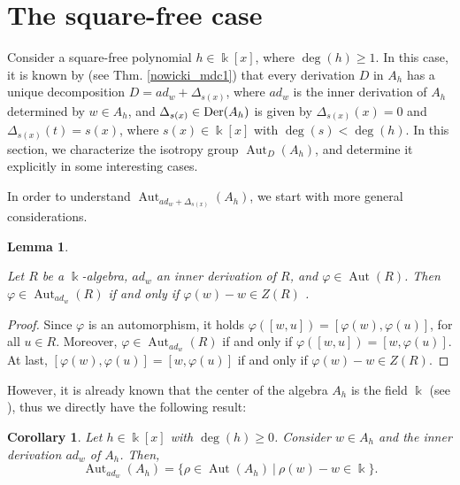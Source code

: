 \documentclass{article}
\numberwithin{equation}{section}\theoremstyle{plain}
\newtheorem{corollary}[theorem]{Corollary}
\newtheorem{lemma}[theorem]{Lemma}
\newcommand{\der}{{\rm Der}}
\DeclareMathOperator{\Aut}{Aut}
\begin{document}
\section{The square-free case}\label{section4}

Consider a  square-free polynomial $h\in \Bbbk[x]$, where $\deg(h)\geq 1$.
In this case, it is known by \cite{Nowicki} (see Thm. \ref{nowicki_mdc1}) that every derivation $D$ in $A_h$ has a unique decomposition $D=ad_w + \Delta_{s(x)}$, where $ad_w$ is the inner derivation of $A_h$ determined by $w \in A_h$, and $\Delta_{s(x)} \in \der(A_h)$ is given by  $\Delta_{s(x)} (x)=0$ and $\Delta_{s(x)} (t)=s(x)$, where $s(x) \in \Bbbk[x]$ with $\deg(s) < \deg(h)$. In this section, we characterize the isotropy group $\Aut_D(A_h)$, and determine it explicitly in some interesting cases. 

\medbreak 

In order to understand $\Aut_{ad_w + \Delta_{s(x)}}(A_h)$, we start with more general considerations.

\begin{lemma}\label{lema_interna_geral}
    
Let $ R $ be a $ \Bbbk$-algebra, $ ad_w $ an inner derivation of $R$, and $ \varphi \in \Aut(R) $. Then $ \varphi \in \Aut_{ad_w}(R) $ if and only if $ \varphi(w) - w \in Z(R)$ .
\end{lemma}
\begin{proof} 
Since $ \varphi $ is an automorphism, it holds $ \varphi([w,u]) = [\varphi(w), \varphi(u)]$, for all $ u \in R $.
Moreover, $ \varphi \in \Aut_{ad_w}(R) $ if and only if $ \varphi([w,u]) = [w, \varphi(u)]$.
At last, $[\varphi(w), \varphi(u)] = [w, \varphi(u)]$ if and only if $\varphi(w) -w \in Z(R)$.
\end{proof}


However, it is already known that the center of the algebra $A_h$ is the field $\Bbbk$ (see \cite[Sec. 5]{BLO2015}), thus we directly have the following result: 



\begin{corollary} \label{eq_groupisot_interna} Let $h \in \Bbbk[x]$ with $\deg(h)\geq 0$. Consider $w \in A_h$ and the inner derivation $ad_w$ of $A_h$.
    Then, %
    \begin{equation*}
    \Aut_{ad_w}(A_h)=\{\rho \in \Aut(A_h) \ | \ \rho(w)-w\in \Bbbk \}.
    \end{equation*}
    \end{corollary}
\end{document}
